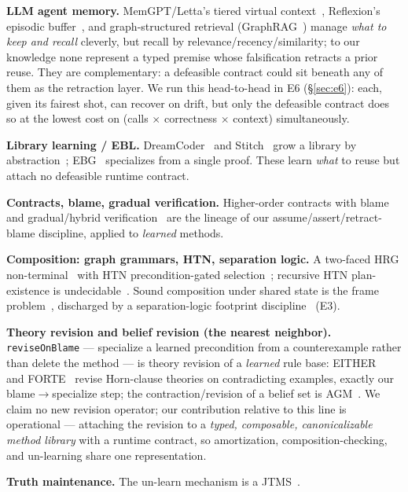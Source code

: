 \documentclass[11pt]{article}
\begin{document}
\textbf{LLM agent memory.} MemGPT/Letta's tiered virtual context~\cite{packer2023}, Reflexion's episodic
buffer~\cite{shinn2023}, and graph-structured retrieval (GraphRAG~\cite{edge2024}) manage \emph{what to keep and
recall} cleverly, but recall by relevance/recency/similarity; to our knowledge none represent a typed premise whose
falsification retracts a prior reuse. They are complementary: a defeasible contract could sit beneath any of them as
the retraction layer. We run this head-to-head in E6 (\S\ref{sec:e6}): each, given its fairest shot, can recover on
drift, but only the defeasible contract does so at the lowest cost on (calls $\times$ correctness $\times$ context)
simultaneously.

\textbf{Library learning / EBL.} DreamCoder~\cite{ellis2021} and Stitch~\cite{bowers2023} grow a library by
abstraction~\cite{plotkin1970}; EBG~\cite{mitchell1986} specializes from a single proof. These learn \emph{what} to
reuse but attach no defeasible runtime contract.

\textbf{Contracts, blame, gradual verification.} Higher-order contracts with blame~\cite{findler2002} and
gradual/hybrid verification~\cite{bader2018} are the lineage of our assume/assert/retract-blame discipline, applied
to \emph{learned} methods.

\textbf{Composition: graph grammars, HTN, separation logic.} A two-faced HRG non-terminal~\cite{habel1992,drewes1997,
courcelle1990} with HTN precondition-gated selection~\cite{erol1994}; recursive HTN plan-existence is
undecidable~\cite{erol1996}. Sound composition under shared state is the frame problem~\cite{mccarthy1969},
discharged by a separation-logic footprint discipline~\cite{ohearn2001,reynolds2002} (E3).

\textbf{Theory revision and belief revision (the nearest neighbor).} \texttt{reviseOnBlame} --- specialize a learned
precondition from a counterexample rather than delete the method --- is theory revision of a \emph{learned} rule
base: EITHER~\cite{ourston1994} and FORTE~\cite{richards1995} revise Horn-clause theories on contradicting examples,
exactly our blame$\to$specialize step; the contraction/revision of a belief set is AGM~\cite{agm1985}. We claim no
new revision operator; our contribution relative to this line is operational --- attaching the revision to a
\emph{typed, composable, canonicalizable method library} with a runtime contract, so amortization,
composition-checking, and un-learning share one representation.

\textbf{Truth maintenance.} The un-learn mechanism is a JTMS~\cite{doyle1979,dekleer1986}.
\end{document}
